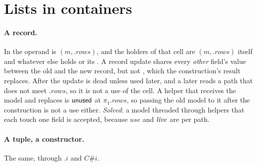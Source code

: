 \section{Lists in containers}
\label{sec:hard-containers}

\paragraph{A record.} In  the operand is $(m, .\mathit{rows})$,
and the holders of that cell are $(m, .\mathit{rows})$ itself and whatever else holds  or its
. A record update shares every \emph{other} field's value between the old and the new
record, but not , which the construction's result replaces. After the update  is dead
unless used later, and a later  reads a path that does not meet $.\mathit{rows}$, so it is
not a use of the cell. A helper that receives the model and replaces  is $\mathsf{unused}$ at
$\pi_1.\mathit{rows}$, so passing the old model to it after the construction is not a use either.
\emph{Solved}: a model threaded through helpers that each touch one field is accepted, because
$\mathit{use}$ and $\mathit{live}$ are per path.

\paragraph{A tuple, a constructor.} The same, through $.i$ and $C\#i$.

